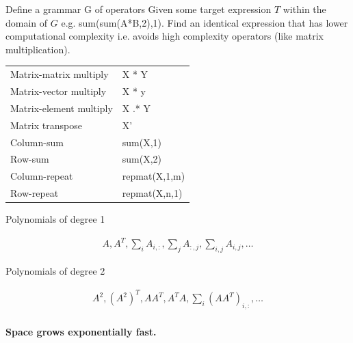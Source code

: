 \documentclass[landscape,a0b]{a0poster_csml_v2}
\begin{document}
\begin{poster}
\begin{PosterColumn}
Define a grammar G of operators
Given some target expression $T$ within the domain of $G$
e.g. sum(sum(A*B,2),1). Find an identical expression that has lower computational 
complexity i.e. avoids high complexity operators (like matrix multiplication).
\vspace{1cm}

\begin{minipage}[hc]{0.47\textwidth}
  \begin{center}
    \begin{tabular}{ll}
      \hline
      Matrix-matrix multiply   \hspace{1cm}   &  X * Y \\
      Matrix-vector multiply      & X * y \\
      Matrix-element multiply     & X .* Y \\
      Matrix transpose            & X’ \\
      Column-sum                  & sum(X,1) \\
      Row-sum                     & sum(X,2) \\
      Column-repeat               & repmat(X,1,m) \\
      Row-repeat                  & repmat(X,n,1) \\
      \hline
    \end{tabular}
  \end{center}
\end{minipage}
\hfill
\begin{minipage}[hc]{0.47\textwidth}
\begin{center}
Polynomials of degree 1
\end{center}
\begin{align*}
  A, A^T, \sum_i A_{i, :}, \sum_j A_{:, j}, \sum_{i, j} A_{i, j}, \dots 
\end{align*}
\begin{center}
Polynomials of degree 2
\end{center}
\begin{align*}
  A^2, (A^2)^T, AA^T, A^TA, \sum_i (AA^T)_{i, :}, \dots \\
\end{align*}
\end{minipage}
\vspace{-1cm}
\begin{center}
  {\bf Space grows exponentially fast.}
\end{center}
\vspace{-1cm}


\end{PosterColumn}
\end{poster}
\end{document}
